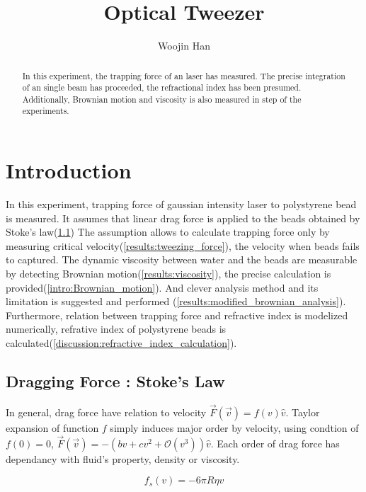 \documentclass{article}
\begin{document}
\title{Optical Tweezer}
\author[1]{Woojin Han}
\maketitle
\begin{abstract}
    In this experiment, the trapping force of an laser has measured. The precise integration of an single beam has proceeded, the refractional index has been presumed.
    Additionally, Brownian motion and viscosity is also measured in step of the experiments.
\end{abstract}

\section{Introduction}
\label{sec:intro}
In this experiment, trapping force of gaussian intensity laser to polystyrene bead is measured.
It assumes that linear drag force is applied to the beads obtained by Stoke's law(\ref{intro:Stokes_law})
The assumption allows to calculate trapping force only by measuring critical velocity(\ref{results:tweezing_force}), the velocity when beads fails to captured.
The dynamic viscosity between water and the beads are measurable by detecting Brownian motion(\ref{results:viscosity}), the precise calculation is provided(\ref{intro:Brownian_motion}).
And clever analysis method and its limitation is suggested and performed (\ref{results:modified_brownian_analysis}).
Furthermore, relation between trapping force and refractive index is modelized numerically, refrative index of polystyrene beads is calculated(\ref{discussion:refractive_index_calculation}).


\subsection{Dragging Force : Stoke's Law}
\label{intro:Stokes_law}

In general, drag force have relation to velocity $\vec{F}(\vec{v})=f(v) \hat{v}$.
Taylor expansion of function $f$ simply induces major order by velocity, using condtion of $f(0)=0$, $\vec{F}(\vec{v})=-(bv+cv^2+\mathcal{O}(v^3))\hat{v}$.
Each order of drag force has dependancy with fluid's property, density or viscosity.

\begin{equation}
    f_s(v) = -6 \pi R \eta v
\label{equation:Stokes_law}
\end{equation}
\end{document}
